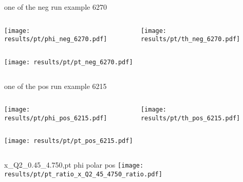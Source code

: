 \begin{frame}{one of the neg run example 6270}
\begin{columns}
\begin{column}[T]{0.5\textwidth}
\texttt{[image: results/pt/phi\_neg\_6270.pdf]}
\end{column}
\begin{column}[T]{0.5\textwidth}
\texttt{[image: results/pt/th\_neg\_6270.pdf]}
\end{column}
\end{columns}
\begin{columns}
\begin{column}[T]{0.5\textwidth}
\texttt{[image: results/pt/pt\_neg\_6270.pdf]}
\end{column}
\begin{column}[T]{0.5\textwidth}
\end{column}
\end{columns}
\end{frame}
\begin{frame}{one of the pos run example 6215}
\begin{columns}
\begin{column}[T]{0.5\textwidth}
\texttt{[image: results/pt/phi\_pos\_6215.pdf]}
\end{column}
\begin{column}[T]{0.5\textwidth}
\texttt{[image: results/pt/th\_pos\_6215.pdf]}
\end{column}
\end{columns}
\begin{columns}
\begin{column}[T]{0.5\textwidth}
\texttt{[image: results/pt/pt\_pos\_6215.pdf]}
\end{column}
\begin{column}[T]{0.5\textwidth}
\end{column}
\end{columns}
\end{frame}
\begin{frame}{x\_Q2\_0.45\_4.750,pt phi polar pos}
\texttt{[image: results/pt/pt\_ratio\_x\_Q2\_45\_4750\_ratio.pdf]}
\end{frame}
